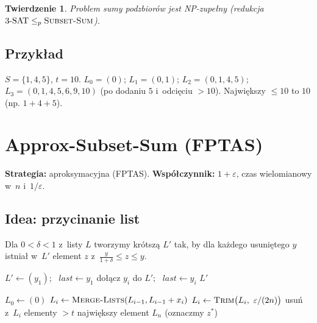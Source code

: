 \documentclass[11pt,a4paper]{article}
\theoremstyle{plain}
\newtheorem{twierdzenie}{Twierdzenie}[section]
\theoremstyle{definition}
\newcommand{\eps}{\varepsilon}
\begin{document}
\begin{twierdzenie}
Problem sumy podzbiorów jest NP\hbox{-}zupełny (redukcja $3\text{-SAT}\le_p \textsc{Subset-Sum}$).
\end{twierdzenie}

\subsection*{Przykład}
$S=\{1,4,5\}$, $t=10$. $L_0=(0)$; $L_1=(0,1)$; $L_2=(0,1,4,5)$; $L_3=(0,1,4,5,6,9,10)$ (po dodaniu
$5$ i~odcięciu $>10$). Największy $\le10$ to $10$ (np. $1+4+5$).

\section{Approx-Subset-Sum (FPTAS)}\label{sec:approxss}
\textbf{Strategia:} aproksymacyjna (FPTAS). \quad\textbf{Współczynnik:} $1+\eps$, czas wielomianowy w~$n$ i~$1/\eps$.

\subsection*{Idea: przycinanie list}
Dla $0<\delta<1$ z~listy $L$ tworzymy krótszą $L'$ tak, by dla każdego usuniętego $y$ istniał w~$L'$
element $z$ z~$\frac{y}{1+\delta}\le z\le y$.
\begin{algorithm}[H]
\caption{Trim($L,\delta$) ($L=(y_1,\dots,y_m)$ rosnąca)}
\begin{algorithmic}[1]
\State $L'\gets(y_1)$; \ $\mathit{last}\gets y_1$
   dołącz $y_i$ do $L'$; \ $\mathit{last}\gets y_i$ \EndIf
\EndFor
\State \Return $L'$
\end{algorithmic}
\end{algorithm}
\begin{algorithm}[H]
\caption{Approx-Subset-Sum($S,t,\eps$)}
\begin{algorithmic}[1]
\State $L_0\gets(0)$
  \State $L_i\gets\textsc{Merge-Lists}(L_{i-1},L_{i-1}+x_i)$
  \State $L_i\gets\textsc{Trim}\big(L_i,\ \eps/(2n)\big)$
  \State usuń z~$L_i$ elementy $>t$
\EndFor
\State \Return największy element $L_n$ (oznaczmy $z^\ast$)
\end{algorithmic}
\end{algorithm}
\end{document}
